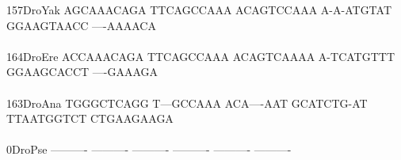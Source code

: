\documentclass[11pt,twoside,reqno,a4paper]{article}
\begin{document}
{157\hspace*{2\charwidth}DroYak	AGCAAACAGA	TTCAGCCAAA	ACAGTCCAAA	A-A-ATGTAT	GGAAGTAACC	----AAAACA	\\
\hspace*{5\charwidth}\hspace*{7\charwidth}\hspace*{1\charwidth}\hspace*{1\charwidth}\hspace*{1\charwidth}\hspace*{1\charwidth}\hspace*{1\charwidth}\hspace*{1\charwidth}\\
164\hspace*{2\charwidth}DroEre	ACCAAACAGA	TTCAGCCAAA	ACAGTCAAAA	A-TCATGTTT	GGAAGCACCT	----GAAAGA	\\
\hspace*{5\charwidth}\hspace*{7\charwidth}\hspace*{1\charwidth}\hspace*{1\charwidth}\hspace*{1\charwidth}\hspace*{1\charwidth}\hspace*{1\charwidth}\hspace*{1\charwidth}\\
163\hspace*{2\charwidth}DroAna	TGGGCTCAGG	T---GCCAAA	ACA----AAT	GCATCTG-AT	TTAATGGTCT	CTGAAGAAGA	\\
\hspace*{5\charwidth}\hspace*{7\charwidth}\hspace*{1\charwidth}\hspace*{1\charwidth}\hspace*{1\charwidth}\hspace*{1\charwidth}\hspace*{1\charwidth}\hspace*{1\charwidth}\\
0\hspace*{4\charwidth}DroPse	----------	----------	----------	----------	----------	----------	\\
\hspace*{5\charwidth}\hspace*{7\charwidth}\hspace*{1\charwidth}\hspace*{1\charwidth}\hspace*{1\charwidth}\hspace*{1\charwidth}\hspace*{1\charwidth}\hspace*{1\charwidth}\\
}
\end{document}
